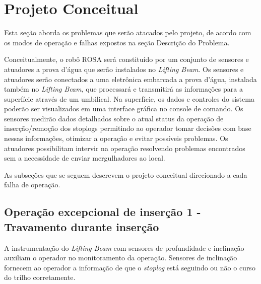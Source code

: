 

\section{Projeto Conceitual}
Esta seção aborda os problemas que serão atacados pelo projeto, de acordo com os modos de operação e falhas expostos na seção Descrição do Problema.

Conceitualmente, o robô ROSA será constituído por um conjunto de sensores e atuadores a prova d’água que serão instalados no \emph{Lifting Beam}. Os sensores e atuadores serão conectados a uma eletrônica embarcada a prova d’água, instalada também no \emph{Lifting Beam}, que processará e transmitirá as informações para a superfície através de um umbilical. Na superfície, os dados e controles do sistema poderão ser visualizados em uma interface gráfica no console de comando. Os sensores medirão dados detalhados sobre o atual status da operação de inserção/remoção dos stoplogs permitindo ao operador tomar decisões com base nessas informações, otimizar a operação e evitar possíveis problemas. Os atuadores possibilitam intervir na operação resolvendo problemas encontrados sem a necessidade de enviar mergulhadores ao local.

As subseções que se seguem descrevem o projeto conceitual direcionado a cada falha de operação.

\subsection{Operação excepcional de inserção 1 - Travamento durante inserção}
A instrumentação do \emph{Lifting Beam} com sensores de profundidade e inclinação auxiliam o operador no monitoramento da operação. Sensores de inclinação fornecem ao operador a informação de que o \emph{stoplog} está seguindo ou não o curso do trilho corretamente.

